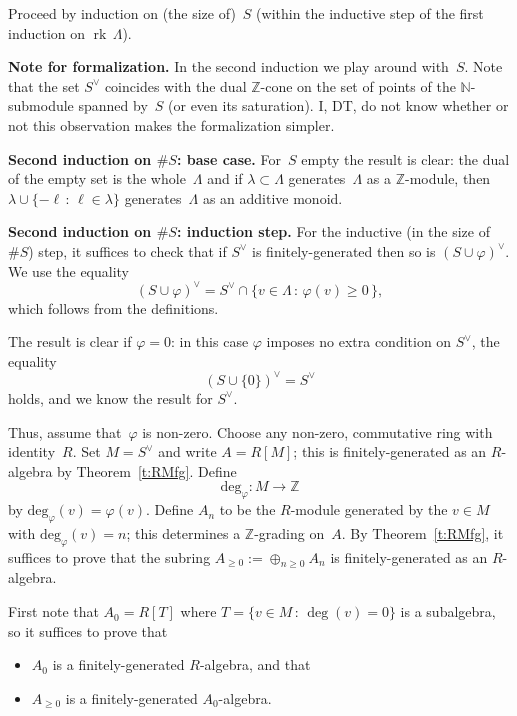 \documentclass{amsart}
\newcommand{\N}{\mathbb{N}}
\newcommand{\Z}{\mathbb{Z}}
\newcommand{\Az}{A_{\geq0}}
\newcommand{\ev}{\textrm{deg}_\varphi}
\newcommand{\form}[1]{\medskip
\parbox{330pt}
{\small{{\textbf{Note for formalization.}}
#1}}
\medskip}
\DeclareMathOperator{\rk}{rk\,}
\begin{document}
Proceed by induction on (the size of)~$S$ (within the inductive step of the first induction on $\rk \Lambda$).

\form{In the second induction we play around with~$S$.  Note that the set $S^\vee$ coincides with the dual $\Z$-cone on the set of points of the $\N$-submodule spanned by~$S$ (or even its saturation).  I, DT, do not know whether or not this observation makes the formalization simpler.}

\noindent
{\textbf{Second induction on $\# S$: base case.}}
For~$S$ empty the result is clear: the dual of the empty set is the whole~$\Lambda$ and if $\lambda \subset \Lambda$ generates~$\Lambda$ as a $\Z$-module, then $\lambda \cup \{ -\ell \, : \, \ell \in \lambda \}$ generates~$\Lambda$ as an additive monoid.

\noindent
{\textbf{Second induction on $\# S$: induction step.}}
For the inductive (in the size of $\#S$) step, it suffices to check that if $S^\vee$ is finitely-generated then so is $(S\cup{\varphi})^\vee$.  We use the equality
\[
(S\cup{\varphi})^\vee = S^\vee \cap \{v \in \Lambda \,:\, \varphi(v)\geq0\,\},
\]
which follows from the definitions.

The result is clear if $\varphi = 0$: in this case $\varphi$ imposes no extra condition on $S^\vee$, the equality
\[
(S \cup \{0\})^\vee = S^\vee
\]
holds, and we know the result for $S^\vee$.

Thus, assume that~$\varphi$ is non-zero.  Choose any non-zero, commutative ring with identity~$R$.  Set $M=S^\vee$ and write $A=R[M]$; this is finitely-generated as an $R$-algebra by Theorem~\ref{t:RMfg}. Define
\[
\ev \colon M\to\Z
\]
by $\ev (v)=\varphi(v)$. Define $A_n$ to be the $R$-module generated by the $v \in M$ with $\ev(v)=n$; this determines a $\Z$-grading on~$A$. By Theorem~\ref{t:RMfg}, it suffices to prove that the subring $A_{\geq0}:=\oplus_{n\geq0}A_n$ is finitely-generated as an $R$-algebra.

First note that $A_0=R[T]$ where $T=\{v \in M \,:\, \deg(v)=0\}$ is a subalgebra, so it suffices to prove that
\begin{itemize}
\item
$A_0$ is a finitely-generated $R$-algebra, and that
\item
$\Az$ is a finitely-generated $A_0$-algebra.
\end{itemize}
\end{document}
